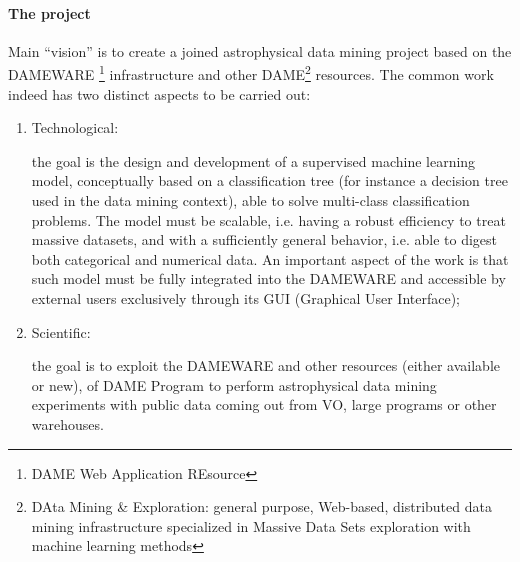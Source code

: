 \documentclass[a4paper,10pt,oneside,onecolumn]{article}
\begin{document}
\paragraph{The project}
Main “vision” is to create a joined astrophysical data mining project
based on the DAMEWARE \footnote{DAME Web Application REsource}
infrastructure and other DAME\footnote{DAta Mining \& Exploration:
  general purpose, Web-based, distributed data mining infrastructure
  specialized in Massive Data Sets exploration with machine learning
  methods } resources.  The common work indeed has two distinct
aspects to be carried out:

\begin{enumerate}
\item{Technological:} 

the goal is the design and development of a supervised machine learning model,
conceptually based on a classification tree (for instance a decision tree used in the data mining context),
able to solve multi-class classification problems. The model must be scalable, i.e. having a robust efficiency
to treat massive datasets, and with a sufficiently general behavior, i.e. able to digest both categorical and
numerical data. An important aspect of the work is that such model must be fully integrated into the
DAMEWARE and accessible by external users exclusively through its GUI (Graphical User Interface);

\item{Scientific:} 

the goal is to exploit the DAMEWARE and other resources (either available or new), of DAME
Program to perform astrophysical data mining experiments with public data coming out from VO, large
programs or other warehouses.
\end{enumerate}



\end{document}
